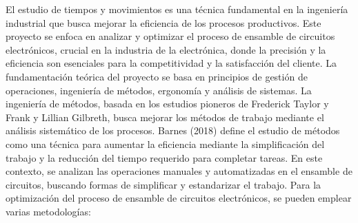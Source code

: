 % 
% 
El estudio de tiempos y movimientos es una técnica fundamental en la ingeniería industrial que busca mejorar la eficiencia de los procesos productivos. Este proyecto se enfoca en analizar y optimizar el proceso de ensamble de circuitos electrónicos, crucial en la industria de la electrónica, donde la precisión y la eficiencia son esenciales para la competitividad y la satisfacción del cliente. La fundamentación teórica del proyecto se basa en principios de gestión de operaciones, ingeniería de métodos, ergonomía y análisis de sistemas.
La ingeniería de métodos, basada en los estudios pioneros de Frederick Taylor y Frank y Lillian Gilbreth, busca mejorar los métodos de trabajo mediante el análisis sistemático de los procesos. Barnes (2018) define el estudio de métodos como una técnica para aumentar la eficiencia mediante la simplificación del trabajo y la reducción del tiempo requerido para completar tareas. En este contexto, se analizan las operaciones manuales y automatizadas en el ensamble de circuitos, buscando formas de simplificar y estandarizar el trabajo.
Para la optimización del proceso de ensamble de circuitos electrónicos, se pueden emplear varias metodologías:
